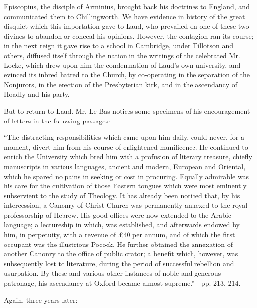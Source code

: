 Episcopius, the disciple of Arminius, brought back his doctrines to
England, and communicated them to Chillingworth. We have evidence in
history of the great disquiet which this importation gave to Laud, who
prevailed on one of these two divines to abandon or conceal his
opinions. However, the contagion ran its course; in the next reign it
gave rise to a school in Cambridge, under Tillotson and others, diffused
itself through the nation in the writings of the celebrated Mr. Locke,
which drew upon him the condemnation of Laud's own university, and
evinced its inbred hatred to the Church, by co-operating in the
separation of the Nonjurors, in the erection of the Presbyterian kirk,
and in the ascendancy of Hoadly and his party.

But to return to Laud. Mr. Le Bas notices some
specimens of his encouragement of letters in the following passages:—

``The distracting responsibilities
which came upon him daily, could never, for a moment, divert him from
his course of enlightened munificence. He continued to enrich the
University which bred him with a profusion of literary treasure, chiefly
manuscripts in various languages, ancient and modern, European and
Oriental, which he spared no pains in seeking or cost in procuring.
Equally admirable was his care for the cultivation of those Eastern
tongues which were most eminently subservient to the study of Theology.
It has already been noticed that, by his intercession, a Canonry of
Christ Church was permanently annexed to the royal professorship of
Hebrew. His good offices were now extended to the Arabic language; a
lectureship in which, was established, and afterwards endowed by him, in
perpetuity, with a revenue of £40 per annum, and of which the first
occupant was the illustrious Pocock. He further obtained the annexation
of another Canonry to the office of public orator; a benefit which,
however, was subsequently lost to literature, during the period of
successful rebellion and usurpation. By these and various other
instances of noble and generous patronage, his ascendancy at Oxford
became almost supreme.''—pp. 213, 214.

Again, three years later:—

